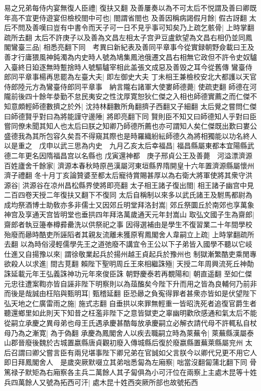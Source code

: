 易之兄弟每侍内宴無復人臣禮|{
	復扶又翻}
及善屢奏以為不可太后不悦謂及善曰卿既年高不宜更侍遊宴但檢校閤中可也|{
	閤謂省閤也}
及善因稱病謁假月餘|{
	假古訝翻}
太后不問及善嘆曰豈有中書令而天子可一日不見乎事可知矣乃上疏乞骸骨|{
	上時掌翻疏所去翻}
太后不許庚子以及善為文昌左相太子宫尹豆盧欽望為文昌右相仍並同鳳閣鸞臺三品|{
	相悉亮翻下同　考異曰新紀表及善同平章事今從實録朝野僉載曰王及善才行庸猥風神鈍濁為内史時人號為鳩集鳳池俄遷文昌右相無它政但不許令史奴驢入臺終日廹逐無時蹔捨時人號驅驢宰相此盖張文成惡及善毁之耳今從舊傳}
鸞臺侍郎同平章事楊再思罷為左臺大夫|{
	即左御史大夫}
丁未相王兼檢校安北大都護以天官侍郎陸元方為鸞臺侍郎同平章事　納言隴右諸軍大使婁師德薨|{
	使疏吏翻}
師德在河隴前後四十餘年㳟勤不怠民夷安之性沈厚寛恕狄仁傑之入相也師德實薦之而仁傑不知意頗輕師德數擠之於外|{
	沈持林翻數所角翻擠子西翻又子細翻}
太后覺之嘗問仁傑曰師德賢乎對曰為將能謹守邊陲|{
	將即亮翻下同}
賢則臣不知又曰師德知人乎對曰臣嘗同僚未聞其知人也太后曰朕之知卿乃師德所薦也亦可謂知人矣仁傑既出歎曰婁公盛德我為其所包容久矣吾不得窺其際也是時羅織紛紜師德久為將相獨能以功名終人以是重之　戊申以武三思為内史　九月乙亥太后幸福昌|{
	福昌縣屬東都本宜陽縣武德二年更名因隋福昌宫以名縣也}
戊寅還神都　庚子邢貞公王及善薨　河溢漂濟源百姓廬舍千餘家|{
	濟源本春秋時原邑漢屬河東垣縣界隋開皇十六年置濟源縣屬懷州濟子禮翻}
冬十月丁亥論贊婆至都太后寵待賞賜甚厚以為右衛大將軍使將其衆守洪源谷|{
	洪源谷在凉州昌松縣界使將即亮翻}
太子相王諸子復出閤|{
	相王諸子幽宫中見二百四卷天授二年復扶又翻下不復同}
太后自稱制以來多以武氏諸王及駙馬都尉為成均祭酒博士助敎亦多非儒士又因郊丘明堂拜洛封嵩|{
	郊丘祭圜丘於南郊也享萬象神宫及享通天宫皆明堂也垂拱四年拜洛萬歲通天元年封嵩山}
取弘文國子生為齋郎|{
	齋郎者執豆籩奉樽彛罍洗以供祭祀之事}
因得選補由是學生不復習業二十年間學校殆廢而曏時酷吏所誣䧟者其親友流離未獲原宥鳳閣舍人韋嗣立上疏|{
	上時掌翻疏所去翻}
以為時俗浸輕儒學先王之道弛廢不講宜令王公以下子弟皆入國學不聽以它岐仕進又自揚豫以來|{
	謂徐敬業起兵於揚州越王貞起兵於豫州也}
制獄漸繁酷吏乘閒專欲殺人以求進|{
	間古莧翻}
賴陛下聖明周丘王來相繼誅殛|{
	天授二年周興流死丘神勣誅延載元年王弘義誅神功元年來俊臣誅}
朝野慶泰若再覩陽和|{
	朝直遥翻}
至如仁傑元忠往遭案鞫亦皆自誣非陛下明察則以為葅醢矣今陛下升而用之皆為良輔何乃前非而後是哉誠由枉陷與甄明耳|{
	甄稽延翻}
臣恐曏之負寃得罪者甚衆亦皆如是伏望陛下弘天地之仁廣雷雨之施|{
	施式志翻}
自垂拱以來罪無輕重一皆昭洗死者追復官爵生者聽還鄉里如此則天下知昔之枉濫非陛下之意皆獄吏之辜幽明歡欣感通和氣太后不能從嗣立承慶之異母弟也母王氏遇承慶甚酷每放承慶嗣立必解衣請代母不許輒私自杖母乃為之漸寛|{
	為于偽翻}
承慶為鳳閣舍人以疾去職嗣立時為萊蕪令|{
	萊蕪縣漢屬泰山郡晉廢後魏於古城置嬴縣唐貞觀初廢入傳城縣后復於廢嬴縣置蕪萊縣屬兖州}
太后召謂曰卿父嘗言臣有兩兒堪事陛下卿兄弟在官誠如父言朕今以卿代兄更不用它人即日拜鳳閣舍人　是歲突厥默啜立其弟咄悉匐為左廂察|{
	咄當沒翻匐蒲北翻下同}
骨篤禄子默矩為右廂察各主兵二萬餘人其子匐俱為小可汗位在兩察上主處木昆等十姓兵四萬餘人又號為拓西可汗|{
	處木昆十姓西突厥所部也故號拓西}


